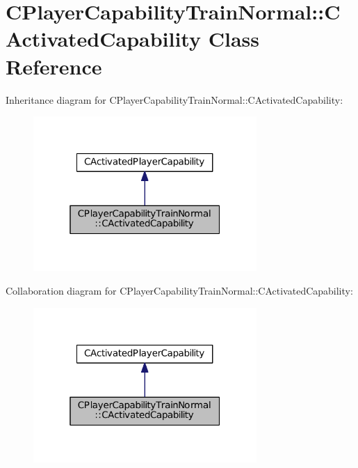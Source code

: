 \hypertarget{classCPlayerCapabilityTrainNormal_1_1CActivatedCapability}{}\section{C\+Player\+Capability\+Train\+Normal\+:\+:C\+Activated\+Capability Class Reference}
\label{classCPlayerCapabilityTrainNormal_1_1CActivatedCapability}


Inheritance diagram for C\+Player\+Capability\+Train\+Normal\+:\+:C\+Activated\+Capability\+:\nopagebreak
\begin{figure}[H]
\begin{center}
\leavevmode
\includegraphics[width=241pt]{classCPlayerCapabilityTrainNormal_1_1CActivatedCapability__inherit__graph}
\end{center}
\end{figure}


Collaboration diagram for C\+Player\+Capability\+Train\+Normal\+:\+:C\+Activated\+Capability\+:\nopagebreak
\begin{figure}[H]
\begin{center}
\leavevmode
\includegraphics[width=241pt]{classCPlayerCapabilityTrainNormal_1_1CActivatedCapability__coll__graph}
\end{center}
\end{figure}
